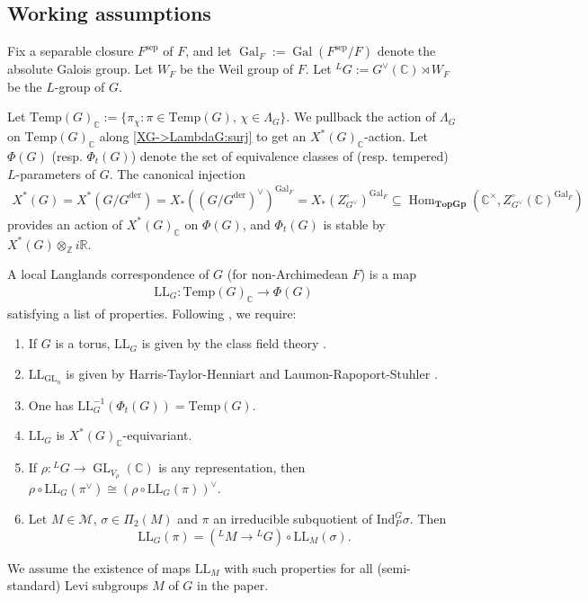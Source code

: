 \documentclass[10pt]{amsart}
\theoremstyle{definition}
\numberwithin{equation}{section}
\DeclareMathOperator{\Hom}{\mathrm{Hom}}
\DeclareMathOperator{\GL}{\mathrm{GL}}
\DeclareMathOperator{\Gal}{\mathrm{Gal}}
\numberwithin{equation}{subsection}
\newcommand{\Ind}{\mathrm{Ind}}
\newcommand{\CC}{\mathbb{C}}
\newcommand{\Temp}{\mathrm{Temp}}
\begin{document}
\subsection{Working assumptions} \label{ssec:assumptions}
Fix a separable closure $F^{\mathrm{sep}}$ of $F$, and let $\Gal_F:=\Gal(F^{\mathrm{sep}}/F)$ denote the absolute Galois group. Let $W_F$ be the Weil group of $F$. Let ${}^LG:=G^\vee(\mathbb{C})\rtimes W_F$ be the $L$-group of $G$. 

Let $\mathrm{Temp}(G)_\CC:=\{\pi_\chi: \pi\in\Temp(G),\,\chi\in\Lambda_G\}.$ We pullback the action of $\Lambda_G$ on $\mathrm{Temp}(G)_\CC$ along \eqref{XG->LambdaG:surj} to get an $X^*(G)_\mathbb{C}$-action.  Let $\Phi(G)$ (resp. $\Phi_t(G)$) denote the set of equivalence classes of (resp. tempered) $L$-parameters of $G$. The canonical injection 
\begin{align}\label{X*G:pair:ZGvee}
    X^*(G) = X^*(G/G^{\mathrm{der}}) = X_*((G/G^{\mathrm{der}})^\vee)^{\Gal_F} = X_*(Z_{G^\vee}^\circ)^{\Gal_F} \subseteq \Hom_{\textbf{TopGp}}(\CC^\times,Z_{G^\vee}^\circ(\CC)^{\Gal_F})
\end{align}
provides an action of $X^*(G)_\mathbb{C}$ on $\Phi(G)$, and $\Phi_t(G)$ is stable by $X^*(G)\otimes_\mathbb{Z}i\mathbb{R}$. 



A local Langlands correspondence of $G$ (for non-Archimedean $F$) is a map 
\begin{align*}
    \mathrm{LL}_G:\mathrm{Temp}(G)_\CC\to \Phi(G)
\end{align*}
satisfying a list of properties. Following \cite{DRS}, we require:
\begin{enumerate}[label=(LLC\text{\arabic*}), ref=LLC\text{\arabic*}]
    \item\label{LLC:LCFT} If $G$ is a torus, $\mathrm{LL}_G$ is given by the class field theory \cite{Langlands:tori}.
    \item\label{LLC:GL} $\mathrm{LL}_{\GL_n}$ is given by Harris-Taylor-Henniart \cite{Harris-Taylor,Henniart} and Laumon-Rapoport-Stuhler \cite{Laumon:Rapoport:Stuhler:LLGLpositive}.
    \item\label{LLC:temp} One has $\mathrm{LL}_G^{-1}(\Phi_t(G)) = \Temp(G)$.
    \item\label{LLC:twist} $\mathrm{LL}_G$ is $X^*(G)_\mathbb{C}$-equivariant.
    \item\label{LLC:dual} If $\rho:{}^LG\longrightarrow\GL_{V_\rho}(\mathbb{C})$ is any representation, then $\rho\circ \mathrm{LL}_G(\pi^\vee)\cong (\rho\circ\mathrm{LL}_G(\pi))^\vee$. 
    \item\label{LLC:para} Let $M\in\mathcal{M}$, $\sigma\in\Pi_2(M)$ and $\pi$ an irreducible subquotient of $\Ind_P^G\sigma$. Then $$\mathrm{LL}_G(\pi) = ({}^LM\longrightarrow {}^LG)\circ \mathrm{LL}_M(\sigma).$$
\end{enumerate}
We assume the existence of maps $\mathrm{LL}_M$ with such properties for all (semi-standard) Levi subgroups $M$ of $G$ in the paper. 
\end{document}

